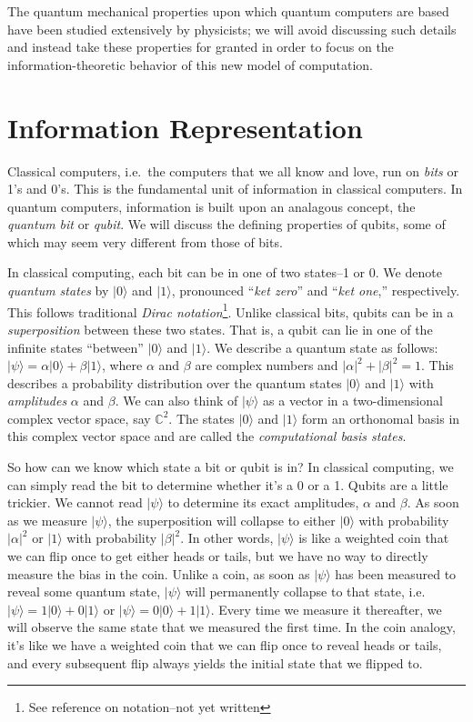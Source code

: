\documentclass[12pt,twoside]{reedthesis}
\newcommand{\C}{\mathbb{C}}
\newcommand{\ketz}{\ensuremath{\lvert 0\rangle}\xspace}
\newcommand{\keto}{\ensuremath{\lvert 1\rangle}\xspace}
\newcommand{\ketpsi}{\ensuremath{|\psi\rangle}\xspace}
\begin{document}
The quantum mechanical properties upon which quantum computers are based have been studied extensively by physicists; we will avoid discussing such details and instead take these properties for granted in order to focus on the information-theoretic behavior of this new model of computation. 

\section{Information Representation}
Classical computers, i.e.~the computers that we all know and love, run on \textit{bits} or 1's and 0's. This is the fundamental unit of information in classical computers. In quantum computers, information is built upon an analagous concept, the \textit{quantum bit} or \textit{qubit}. We will discuss the defining properties of qubits, some of which may seem very different from those of bits.

In classical computing, each bit can be in one of two states--1 or 0.  We denote \textit{quantum states} by \ketz and \keto, pronounced ``\textit{ket zero}'' and ``\textit{ket one},'' respectively. This follows traditional \textit{Dirac notation}\footnote{See reference on notation--not yet written}. Unlike classical bits, qubits can be in a \textit{superposition} between these two states. That is, a qubit can lie in one of the infinite states ``between'' \ketz and \keto. We describe a quantum state as follows: $\ketpsi = \alpha \ketz + \beta \keto$, where $\alpha$ and $\beta$ are complex numbers and $\lvert \alpha \rvert ^2+ \lvert \beta \rvert ^2= 1$. This describes a probability distribution over the quantum states \ketz and \keto with \textit{amplitudes} $\alpha$ and $\beta$. We can also think of \ketpsi as a vector in a two-dimensional complex vector space, say $\C^2$. The states \ketz and \keto form an orthonomal basis in this complex vector space and are called the \textit{computational basis states}.

So how can we know which state a bit or qubit is in? In classical computing, we can simply read the bit to determine whether it's a 0 or a 1. Qubits are a little trickier. We cannot read \ketpsi to determine its exact amplitudes, $\alpha$ and $\beta$. As soon as we measure \ketpsi, the superposition will collapse to either \ketz with probability $ \lvert \alpha \rvert ^2$ or \keto with probability $ \lvert \beta \rvert ^2$. In other words, \ketpsi is like a weighted coin that we can flip once to get either heads or tails, but we have no way to directly measure the bias in the coin. Unlike a coin, as soon as \ketpsi has been measured to reveal some quantum state, \ketpsi will permanently collapse to that state, i.e.~$\ketpsi = 1\ketz + 0 \keto$ or $\ketpsi = 0\ketz + 1\keto$. Every time we measure it thereafter, we will observe the same state that we measured the first time. In the coin analogy, it's like we have a weighted coin that we can flip once to reveal heads or tails, and every subsequent flip always yields the initial state that we flipped to.
\end{document}
